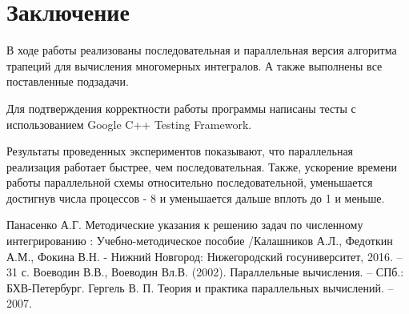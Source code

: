 \documentclass{report}
\begin{document}
\section*{Заключение}
В ходе работы реализованы последовательная и параллельная версия алгоритма трапеций для вычисления многомерных интегралов. А также выполнены все поставленные подзадачи.
\par Для подтверждения корректности работы программы написаны тесты с использованием Google C++ Testing Framework.
\par Результаты проведенных экспериментов показывают, что параллельная реализация работает быстрее, чем последовательная. Также, ускорение времени работы параллельной схемы относительно последовательной, уменьшается достигнув числа процессов - 8 и уменьшается дальше вплоть до 1 и меньше.
\newpage


\begin{thebibliography}{1}
    Панасенко А.Г. Методические указания к решению задач по
    численному интегрированию : Учебно-методическое пособие /Калашников А.Л., Федоткин А.М., Фокина В.Н. - Нижний Новгород: Нижегородский госуниверситет, 2016. – 31 с.
    Воеводин В.В., Воеводин Вл.В. (2002). Параллельные вычисления. – СПб.: БХВ-Петербург.
    Гергель В. П. Теория и практика параллельных вычислений. – 2007.
\end{thebibliography}
\newpage
\end{document}
